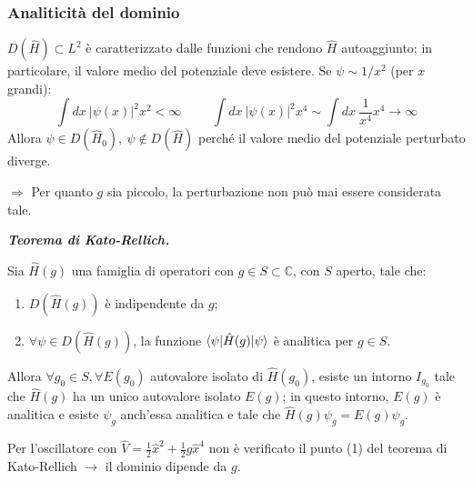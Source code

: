 \documentclass[10pt]{beamer}
\newtheorem{teorema}{Teorema}
\newenvironment{boxenv}[1][]{
    \begin{eqbox}[#1]
    }{
   \end{eqbox}
}
\begin{document}
   \begin{frame}
	   \frametitle{Analiticit\`a del dominio}
	   $D(\hat{H}) \subset L^2$ \`e caratterizzato dalle funzioni che rendono $\hat{H}$ autoaggiunto; in particolare, il valore medio del potenziale deve esistere. Se $\psi \sim 1/x^2$ (per $x$ grandi):
	   \begin{equation*}
	   	\int dx \ \lvert \psi (x) \rvert ^2 x^2 < \infty \hspace{1cm} \int dx\ \lvert \psi (x) \rvert ^2 x^4 \sim \int dx\  \frac{1}{x^4}x^4 \to \infty
	   \end{equation*}
	   Allora $\psi \in D(\hat{H}_0),\ \psi \not \in D(\hat{H})$ perch\'e il valore medio del potenziale perturbato diverge.

	   $\Rightarrow $ Per quanto $g$ sia piccolo, la perturbazione non pu\`o mai essere considerata tale.

	   \begin{boxenv}[]
	   \textbf{\textit{Teorema di Kato-Rellich.} } 

		   Sia $\hat{H}(g)$ una famiglia di operatori con $g \in S \subset \mathbb{C}$, con $S$ aperto, tale che:
		   \begin{enumerate}[1]
		   	\item $D(\hat{H}(g))$ \`e indipendente da $g$;
			\item $\forall \psi \in D(\hat{H}(g))$, la funzione $\braket{\psi |\hat{H}(g)|\psi } $ \`e analitica per $g \in S$.
		   \end{enumerate}  
		   Allora $\forall g_0\in S, \forall E(g_0)$ autovalore isolato di $\hat{H}(g_0)$, esiste un intorno $I_{g_0} $ tale che $\hat{H}(g)$ ha un unico autovalore isolato $E(g)$; in questo intorno, $E(g)$ \`e analitica e esiste $\psi _g$ anch'essa analitica e tale che $\hat{H}(g) \psi _g = E(g) \psi _g$.
	   \end{boxenv}

	Per l'oscillatore con $\hat{V} = \frac{1}{2} \hat{x}^2 + \frac{1}{2}g \hat{x}^4$ non \`e verificato il punto (1) del teorema di Kato-Rellich $\longrightarrow$ il dominio dipende da $g$.
   \end{frame} 
\end{document}
